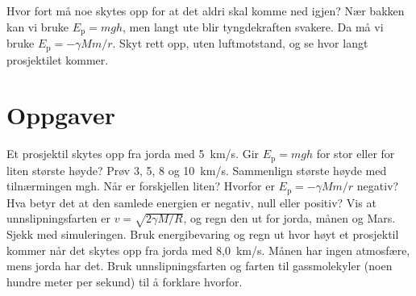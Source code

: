 \documentclass[11pt]{article}
\begin{document}

Hvor fort må noe skytes opp for at det aldri skal komme ned igjen? Nær bakken kan vi bruke $E_{\mathrm{p}} = mgh$, men langt ute blir tyngdekraften svakere. Da må vi bruke $E_{\mathrm{p}} = -γMm/r$. Skyt rett opp, uten luftmotstand, og se hvor langt prosjektilet kommer.

\section*{Oppgaver}

\begin{oppgaveliste}
\oppgave {}Et prosjektil skytes opp fra jorda med 5~km/s. Gir $E_{\mathrm{p}} = mgh$ for stor eller for liten største høyde?
\svar
\oppgave {}Prøv 3, 5, 8 og 10~km/s. Sammenlign største høyde med tilnærmingen mgh. Når er forskjellen liten?
\svar
\oppgave {}Hvorfor er $E_{\mathrm{p}} = -γMm/r$ negativ? Hva betyr det at den samlede energien er negativ, null eller positiv?
\svar
\oppgave {}Vis at unnslipningsfarten er $v = \sqrt{2γM/R}$, og regn den ut for jorda, månen og Mars. Sjekk med simuleringen.
\svar
\oppgave {}Bruk energibevaring og regn ut hvor høyt et prosjektil kommer når det skytes opp fra jorda med 8,0~km/s.
\svar
\oppgave {}Månen har ingen atmosfære, mens jorda har det. Bruk unnslipningsfarten og farten til gassmolekyler (noen hundre meter per sekund) til å forklare hvorfor.
\svar
\end{oppgaveliste}
\end{document}

